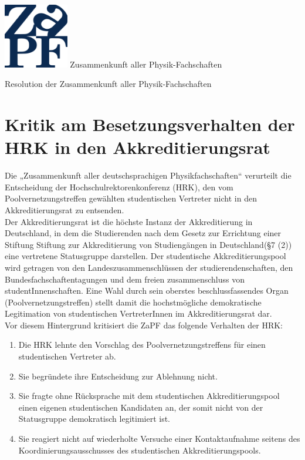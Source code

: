 \documentclass[DIV=calc]{scrartcl}
\begin{document}
\hspace{0.87\textwidth}
\begin{minipage}{120pt}
\vspace{-1.8cm}
\includegraphics[width=80pt]{logo.pdf}
\centering
\small Zusammenkunft aller Physik-Fachschaften
\end{minipage}
\begin{center}
\huge{Resolution der Zusammenkunft aller Physik-Fachschaften} \\
\normalsize
\end{center}

\vspace{1cm}
\section*{Kritik am Besetzungsverhalten der HRK in den Akkreditierungsrat}

Die „Zusammenkunft aller deutschsprachigen Physikfachschaften“ verurteilt die Entscheidung der Hochschulrektorenkonferenz (HRK), den vom Poolvernetzungstreffen gewählten studentischen Vertreter nicht in den Akkreditierungsrat zu entsenden. \\

Der Akkreditierungsrat ist die höchste Instanz der Akkreditierung in Deutschland, in dem die Studierenden nach dem  \glqq Gesetz zur Errichtung einer Stiftung \glqq Stiftung zur Akkreditierung von Studiengängen in Deutschland\grqq (\S 7 (2)) eine vertretene Statusgruppe darstellen. Der studentische Akkreditierungspool wird getragen von den Landeszusammenschlüssen der studierendenschaften, den Bundesfachschaftentagungen und dem freien zusammenschluss von studentInnenschaften. Eine Wahl durch sein oberstes beschlussfassendes Organ (Poolvernetzungstreffen) stellt damit die hochstmögliche demokratische Legitimation von studentischen VertreterInnen im Akkreditierungsrat dar. \\

Vor diesem Hintergrund kritisiert die ZaPF das folgende Verhalten der HRK:

\begin{enumerate}
	\item Die HRK lehnte den Vorschlag des Poolvernetzungstreffens für einen studentischen Vertreter ab.
	\item Sie begründete ihre Entscheidung zur Ablehnung nicht.
	\item Sie fragte ohne Rücksprache mit dem studentischen Akkreditierungspool einen eigenen studentischen Kandidaten an, der somit nicht von der Statusgruppe demokratisch legitimiert ist.
	\item Sie reagiert nicht auf wiederholte Versuche einer Kontaktaufnahme seitens des Koordinierungsausschusses des studentischen Akkreditierungspools.

\end{enumerate}
 
\end{document}
